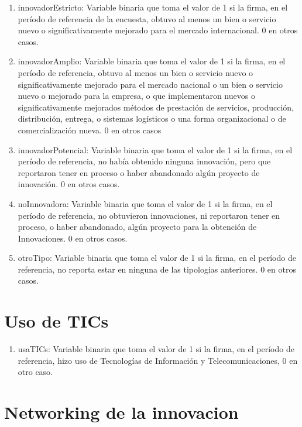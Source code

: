 \documentclass[12pt,a4paper]{article}
\begin{document}
\begin{enumerate}
	\item innovadorEstricto: Variable binaria que toma el valor de 1 si la firma, en el período de referencia de la encuesta, obtuvo al menos un bien o servicio nuevo o significativamente mejorado para el mercado internacional. 0 en otros casos.
	\item innovadorAmplio: Variable binaria que toma el valor de 1 si la firma, en el período de referencia, obtuvo al menos un bien o servicio nuevo o significativamente mejorado para el mercado nacional o un bien o servicio nuevo o mejorado para la empresa, o que implementaron nuevos o significativamente mejorados métodos de prestación de servicios, producción, distribución, entrega, o sistemas logísticos o una forma organizacional o de comercialización nueva. 0 en otros casos
	\item innovadorPotencial: Variable binaria que toma el valor de 1 si la firma, en el período de referencia, no había obtenido ninguna innovación, pero que reportaron tener en proceso o haber abandonado algún proyecto de innovación. 0 en otros casos.
	\item noInnovadora: Variable binaria que toma el valor de 1 si la firma, en el período de referencia, no obtuvieron innovaciones, ni reportaron tener en proceso, o haber abandonado, algún proyecto para la obtención de Innovaciones. 0 en otros casos.
	\item otroTipo: Variable binaria que toma el valor de 1 si la firma, en el período de referencia, no reporta estar en ninguna de las tipologias anteriores. 0 en otros casos.
\end{enumerate}

\section{Uso de TICs}

\begin{enumerate}
	\item usaTICs: Variable binaria que toma el valor de 1 si la firma, en el período de referencia, hizo uso de Tecnologías de Información y Telecomunicaciones, 0 en otro caso.
\end{enumerate}

\section{Networking de la innovacion}
\end{document}
